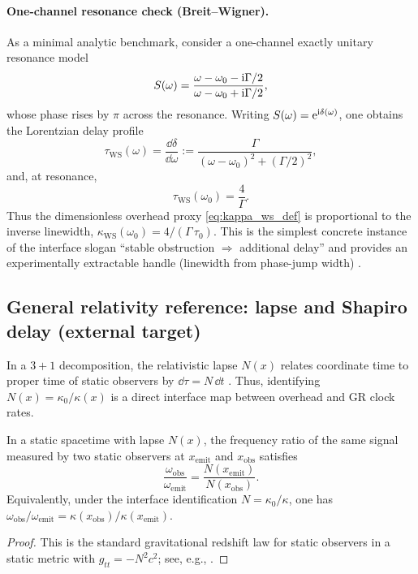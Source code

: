 \paragraph{One-channel resonance check (Breit--Wigner).}
As a minimal analytic benchmark, consider a one-channel exactly unitary resonance model
\begin{equation}
\label{eq:breit_wigner_S_omega}
S(\omega)=\frac{\omega-\omega_0-\mathrm{i}\Gamma/2}{\omega-\omega_0+\mathrm{i}\Gamma/2},
\end{equation}
whose phase rises by $\pi$ across the resonance.
Writing $S(\omega)=\mathrm{e}^{\mathrm{i}\delta(\omega)}$, one obtains the Lorentzian delay profile
\begin{equation}
\label{eq:breit_wigner_tau_omega}
\tau_{\mathrm{WS}}(\omega)=\frac{\dd\delta}{\dd\omega}
:=\frac{\Gamma}{(\omega-\omega_0)^2+(\Gamma/2)^2},
\end{equation}
and, at resonance,
\begin{equation}
\label{eq:tau_ws_peak}
\tau_{\mathrm{WS}}(\omega_0)=\frac{4}{\Gamma}.
\end{equation}
Thus the dimensionless overhead proxy \eqref{eq:kappa_ws_def} is proportional to the inverse linewidth, $\kappa_{\mathrm{WS}}(\omega_0)=4/(\Gamma\,\tau_0)$.
This is the simplest concrete instance of the interface slogan ``stable obstruction $\Rightarrow$ additional delay'' and provides an experimentally extractable handle (linewidth from phase-jump width) \cite{Wigner1955,Smith1960}.

\subsection{General relativity reference: lapse and Shapiro delay (external target)}
\label{app:gr_lapse_shapiro_target}

In a $3{+}1$ decomposition, the relativistic lapse $N(x)$ relates coordinate time to proper time of static observers by $\dd\tau=N\,\dd t$ \cite{Wald1984}.
Thus, identifying $N(x)=\kappa_0/\kappa(x)$ is a direct interface map between overhead and GR clock rates.

\begin{proposition}\label{prop:static_redshift_lapse}
In a static spacetime with lapse $N(x)$, the frequency ratio of the same signal measured by two static observers at $x_{\mathrm{emit}}$ and $x_{\mathrm{obs}}$ satisfies
\[
\frac{\omega_{\mathrm{obs}}}{\omega_{\mathrm{emit}}}=\frac{N(x_{\mathrm{emit}})}{N(x_{\mathrm{obs}})}.
\]
Equivalently, under the interface identification $N=\kappa_0/\kappa$, one has $\omega_{\mathrm{obs}}/\omega_{\mathrm{emit}}=\kappa(x_{\mathrm{obs}})/\kappa(x_{\mathrm{emit}})$.
\end{proposition}
\begin{proof}
This is the standard gravitational redshift law for static observers in a static metric with $g_{tt}=-N^2c^2$; see, e.g., \cite{Wald1984,Will1993}.
\end{proof}


